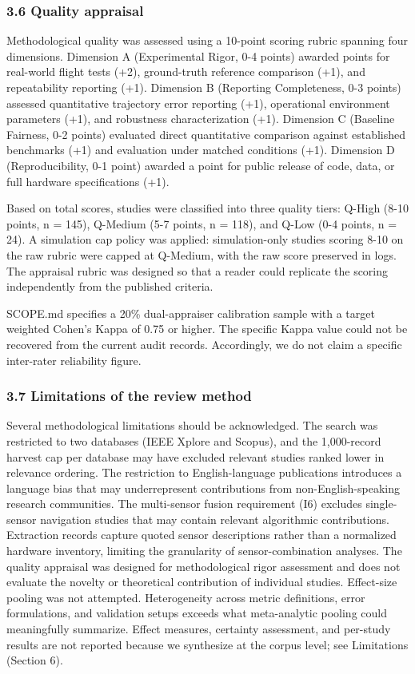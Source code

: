 \documentclass[conference]{IEEEtran}
\begin{document}
\subsubsection{3.6 Quality appraisal}


Methodological quality was assessed using a 10-point scoring rubric spanning four dimensions. Dimension A (Experimental Rigor, 0-4 points) awarded points for real-world flight tests (+2), ground-truth reference comparison (+1), and repeatability reporting (+1). Dimension B (Reporting Completeness, 0-3 points) assessed quantitative trajectory error reporting (+1), operational environment parameters (+1), and robustness characterization (+1). Dimension C (Baseline Fairness, 0-2 points) evaluated direct quantitative comparison against established benchmarks (+1) and evaluation under matched conditions (+1). Dimension D (Reproducibility, 0-1 point) awarded a point for public release of code, data, or full hardware specifications (+1).


Based on total scores, studies were classified into three quality tiers: Q-High (8-10 points, n = 145), Q-Medium (5-7 points, n = 118), and Q-Low (0-4 points, n = 24). A simulation cap policy was applied: simulation-only studies scoring 8-10 on the raw rubric were capped at Q-Medium, with the raw score preserved in logs. The appraisal rubric was designed so that a reader could replicate the scoring independently from the published criteria.


SCOPE.md specifies a 20\% dual-appraiser calibration sample with a target weighted Cohen's Kappa of 0.75 or higher. The specific Kappa value could not be recovered from the current audit records. Accordingly, we do not claim a specific inter-rater reliability figure.


\subsubsection{3.7 Limitations of the review method}


Several methodological limitations should be acknowledged. The search was restricted to two databases (IEEE Xplore and Scopus), and the 1,000-record harvest cap per database may have excluded relevant studies ranked lower in relevance ordering. The restriction to English-language publications introduces a language bias that may underrepresent contributions from non-English-speaking research communities. The multi-sensor fusion requirement (I6) excludes single-sensor navigation studies that may contain relevant algorithmic contributions. Extraction records capture quoted sensor descriptions rather than a normalized hardware inventory, limiting the granularity of sensor-combination analyses. The quality appraisal was designed for methodological rigor assessment and does not evaluate the novelty or theoretical contribution of individual studies. Effect-size pooling was not attempted. Heterogeneity across metric definitions, error formulations, and validation setups exceeds what meta-analytic pooling could meaningfully summarize. Effect measures, certainty assessment, and per-study results are not reported because we synthesize at the corpus level; see Limitations (Section 6).
\end{document}
